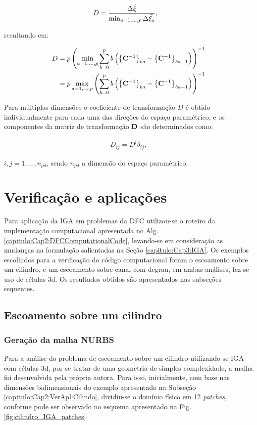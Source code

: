 \documentclass[tese_patricia]{subfiles}
\begin{document}
\begin{align}
	D&=\frac{\Delta\hat{\xi}}{\min_{a=1,...,p} \Delta\tilde{\xi_{a}}},
\end{align}

\noindent resultando em:

\begin{align}
	D&={p}\left(\min_{a=1,...,p} \sum_{b=0}^{p} b \left(\left\{\mathbf{C}^{-1}\right\}_{ba} - \left\{\mathbf{C}^{-1}\right\}_{ba-1}\right)\right)^{-1} \\
	  &={p}\max_{a=1,...,p}\left(\sum_{b=0}^{p} b \left(\left\{\mathbf{C}^{-1}\right\}_{ba} - \left\{\mathbf{C}^{-1}\right\}_{ba-1}\right)\right)^{-1}
\end{align}

Para múltiplas dimensões o coeficiente de transformação $D$ é obtido individualmente para cada uma das direções do espaço paramétrico, e os componentes da matriz de transformação $\mathbf{D}$ são determinados como:

\begin{align}
	D_{ij} = D^{i} \delta_{ij},
\end{align}

\noindent $i,j = 1,...,n_{pd}$, sendo $n_{pd}$ a dimensão do espaço paramétrico.


\section{Verificação e aplicações}

Para aplicação da IGA em problemas da DFC utilizou-se o roteiro da implementação computacional apresentada no Alg. \ref{capitulo:Cap2:DFCComputationalCode}, levando-se em consideração as mudanças na formulação salientadas na Seção \ref{capitulo:Cap3:IGA}. Os exemplos escolhidos para a verificação do código computacional foram o escoamento sobre um cilindro, e um escoamento sobre canal com degrau, em ambas análises, fez-se uso de células 3d. Os resultados obtidos são apresentados nas subseções sequentes.

\subsection {Escoamento sobre um cilindro}

\subsubsection {Geração da malha NURBS}

Para a análise do problema de escoamento sobre um cilindro utilizando-se IGA  com células 3d, por se tratar de uma geometria de simples complexidade, a malha foi desenvolvida pela própria autora. Para isso, inicialmente, com base nas dimensões bidimensionais do exemplo apresentado na Subseção \ref{capitulo:Cap2:VerApl:Cilindo}, dividiu-se o domínio físico em 12 \textit{patches}, conforme pode ser observado no esquema apresentado na Fig. \ref{fig:cilindro_IGA_patches}.
\end{document}
